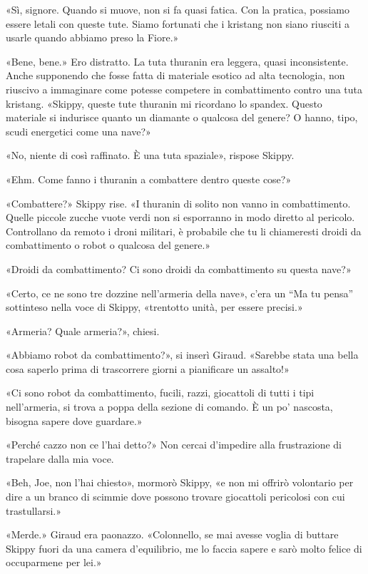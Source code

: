 «Sì, signore. Quando si muove, non si fa quasi fatica. Con la pratica,
possiamo essere letali con queste tute. Siamo fortunati che i kristang
non siano riusciti a usarle quando abbiamo preso la Fiore.»

«Bene, bene.» Ero distratto. La tuta thuranin era leggera, quasi
inconsistente. Anche supponendo che fosse fatta di materiale esotico ad
alta tecnologia, non riuscivo a immaginare come potesse competere in
combattimento contro una tuta kristang. «Skippy, queste tute thuranin mi
ricordano lo spandex. Questo materiale si indurisce quanto un diamante o
qualcosa del genere? O hanno, tipo, scudi energetici come una nave?»

«No, niente di così raffinato. È una tuta spaziale», rispose Skippy.

«Ehm. Come fanno i thuranin a combattere dentro queste cose?»

«Combattere?» Skippy rise. «I thuranin di solito non vanno in
combattimento. Quelle piccole zucche vuote verdi non si esporranno in
modo diretto al pericolo. Controllano da remoto i droni militari, è
probabile che tu li chiameresti droidi da combattimento o robot o
qualcosa del genere.»

«Droidi da combattimento? Ci sono droidi da combattimento su questa
nave?»

«Certo, ce ne sono tre dozzine nell'armeria della nave», c'era un ``Ma
tu pensa'' sottinteso nella voce di Skippy, «trentotto unità, per essere
precisi.»

«Armeria? Quale armeria?», chiesi.

«Abbiamo robot da combattimento?», si inserì Giraud. «Sarebbe stata una
bella cosa saperlo prima di trascorrere giorni a pianificare un
assalto!»

«Ci sono robot da combattimento, fucili, razzi, giocattoli di tutti i
tipi nell'armeria, si trova a poppa della sezione di comando. È un po'
nascosta, bisogna sapere dove guardare.»

«Perché cazzo non ce l'hai detto?» Non cercai d'impedire alla
frustrazione di trapelare dalla mia voce.

«Beh, Joe, non l'hai chiesto», mormorò Skippy, «e non mi offrirò
volontario per dire a un branco di scimmie dove possono trovare
giocattoli pericolosi con cui trastullarsi.»

«Merde.» Giraud era paonazzo. «Colonnello, se mai avesse voglia di
buttare Skippy fuori da una camera d'equilibrio, me lo faccia sapere e
sarò molto felice di occuparmene per lei.»

